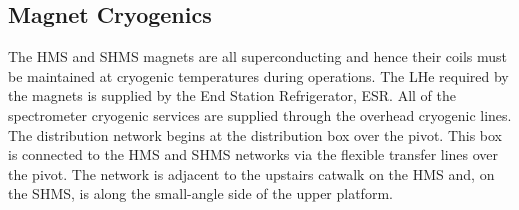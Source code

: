 {\begin{table}
\begin{center}
\caption{Characteristics of the SHMS Magnets\label{tab:magnet_parameters}}
\end{center}
\end{table}

\subsection {Magnet Cryogenics}

The HMS and SHMS magnets are all
superconducting and hence their coils must be maintained at
cryogenic temperatures during operations. The LHe required by the magnets
is supplied by the End Station Refrigerator, ESR.
All of the spectrometer cryogenic services are supplied through the overhead
cryogenic lines. The distribution network begins at the distribution
box over the pivot. This box is connected to the HMS and SHMS networks via the
flexible transfer lines over the pivot. The network is adjacent to
the upstairs catwalk on the HMS and, on the SHMS, is along the small-angle side
of the upper platform.

}
